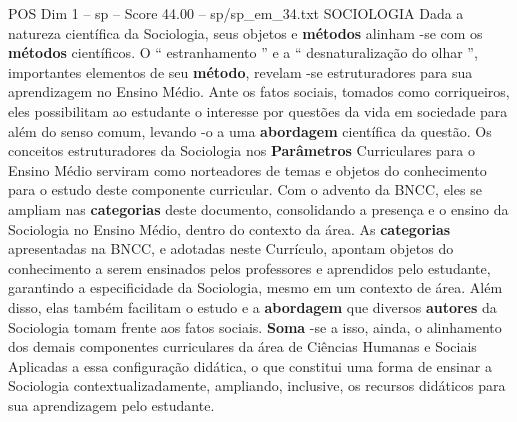 \begin{textsample}{POS Dim 1 – sp – Score 44.00 – sp/sp\_em\_34.txt}
SOCIOLOGIA Dada a natureza científica da Sociologia, seus objetos e \textbf{métodos} alinham -se com os \textbf{métodos} científicos.
O “ estranhamento ” e a “ desnaturalização do olhar ”, importantes elementos de seu \textbf{método}, revelam -se estruturadores para sua aprendizagem no Ensino Médio.
Ante os fatos sociais, tomados como corriqueiros, eles possibilitam ao estudante o interesse por questões da vida em sociedade para além do senso comum, levando -o a uma \textbf{abordagem} científica da questão.
Os conceitos estruturadores da Sociologia nos \textbf{Parâmetros} Curriculares para o Ensino Médio serviram como norteadores de temas e objetos do conhecimento para o estudo deste componente curricular.
Com o advento da BNCC, eles se ampliam nas \textbf{categorias} deste documento, consolidando a presença e o ensino da Sociologia no Ensino Médio, dentro do contexto da área.
As \textbf{categorias} apresentadas na BNCC, e adotadas neste Currículo, apontam objetos do conhecimento a serem ensinados pelos professores e aprendidos pelo estudante, garantindo a especificidade da Sociologia, mesmo em um contexto de área.
Além disso, elas também facilitam o estudo e a \textbf{abordagem} que diversos \textbf{autores} da Sociologia tomam frente aos fatos sociais. \textbf{Soma} -se a isso, ainda, o alinhamento dos demais componentes curriculares da área de Ciências Humanas e Sociais Aplicadas a essa configuração didática, o que constitui uma forma de ensinar a Sociologia contextualizadamente, ampliando, inclusive, os recursos didáticos para sua aprendizagem pelo estudante.

\end{textsample}
